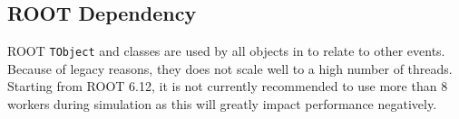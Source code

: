 \subsection{ROOT Dependency}
ROOT \texttt{TObject} and  classes are used by all objects in \apsq to relate to other events.
Because of legacy reasons, they does not scale well to a high number of threads.
Starting from ROOT 6.12, it is not currently recommended to use more than 8 workers during simulation as this will greatly impact performance negatively.